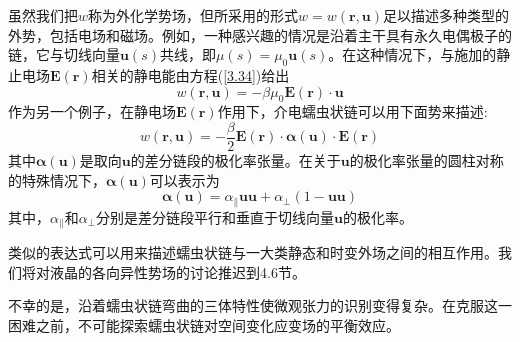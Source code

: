 虽然我们把$w$称为外化学势场，但所采用的形式$w=w(\mathbf{r},\mathbf{u})$足以描述多种类型的外势，包括电场和磁场。例如，一种感兴趣的情况是沿着主干具有永久电偶极子的链，它与切线向量$\mathbf{u}(s)$共线，即$\mu(s)=\mu_0\mathbf{u}(s)$。在这种情况下，与施加的静止电场$\mathbf{E}(\mathbf{r})$相关的静电能由方程(\ref{3.34})给出
\begin{equation}\label{3.42}
w(\mathbf{r},\mathbf{u})=-\beta\mu_0\mathbf{E}(\mathbf{r})\cdot\mathbf{u}
\end{equation}
作为另一个例子，在静电场$\mathbf{E}(\mathbf{r})$作用下，介电蠕虫状链可以用下面势来描述:
\begin{equation}\label{3.43}
w(\mathbf{r},\mathbf{u})=-\frac{\beta}{2}\mathbf{E}(\mathbf{r})\cdot\boldsymbol{\alpha}(\mathbf{u})\cdot\mathbf{E}(\mathbf{r})
\end{equation}
其中$\boldsymbol{\alpha}(\mathbf{u})$是取向$\mathbf{u}$的差分链段的极化率张量。在关于$\mathbf{u}$的极化率张量的圆柱对称的特殊情况下，$\boldsymbol{\alpha}(\mathbf{u})$可以表示为
\begin{equation}\label{3.44}
\boldsymbol{\alpha}(\mathbf{u})=\alpha_{\parallel}\mathbf{u}\mathbf{u}+\alpha_{\perp}(1-\mathbf{u}\mathbf{u})
\end{equation}
其中，$\alpha_{\parallel}$和$\alpha_{\perp}$分别是差分链段平行和垂直于切线向量$\mathbf{u}$的极化率。

类似的表达式可以用来描述蠕虫状链与一大类静态和时变外场之间的相互作用。我们将对液晶的各向异性势场的讨论推迟到4.6节。

不幸的是，沿着蠕虫状链弯曲的三体特性使微观张力的识别变得复杂。在克服这一困难之前，不可能探索蠕虫状链对空间变化应变场的平衡效应。
